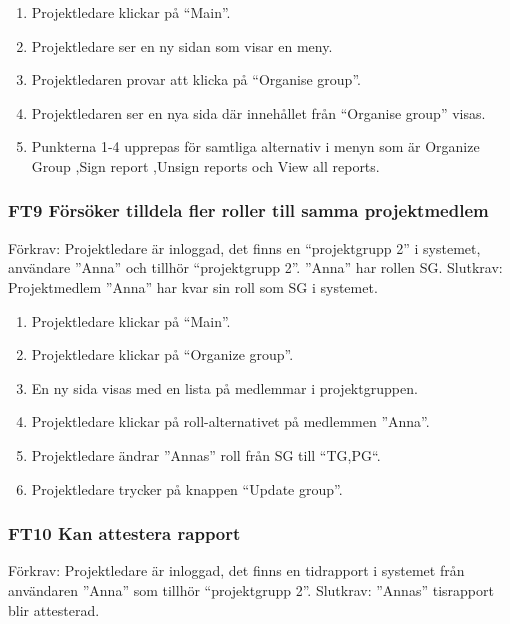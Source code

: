 \documentclass[paper=a4, fontsize=11pt,twoside]{article}
\begin{document}
	\begin{enumerate}
	  \item Projektledare klickar på “Main”.
	  \item Projektledare ser en ny sidan som visar en meny.
	  \item Projektledaren provar att klicka på “Organise group”.
      \item Projektledaren ser en nya sida där innehållet från “Organise group”
      visas. 
      \item Punkterna 1-4 upprepas för samtliga alternativ i menyn som är
      Organize Group ,Sign report ,Unsign reports och View all reports.
	\end{enumerate}
	
	\subsubsection*{FT9 Försöker tilldela fler roller till samma projektmedlem}
	
	Förkrav: Projektledare är inloggad, det finns en “projektgrupp 2” i systemet,
	användare  ”Anna” och tillhör “projektgrupp 2”. ”Anna” har rollen SG.
	\newline
	Slutkrav: Projektmedlem ”Anna” har kvar sin roll som SG i systemet.
	
	\begin{enumerate}
	 \item Projektledare klickar på “Main”.
	\item Projektledare klickar på “Organize group”.
	\item En ny sida visas med en lista på medlemmar i projektgruppen.
	\item Projektledare klickar på roll-alternativet på medlemmen ”Anna”.
	\item Projektledare ändrar ”Annas” roll från SG till “TG,PG“.
	\item Projektledare trycker på knappen “Update group”.

	  
	\end{enumerate}

	\subsubsection*{FT10 Kan attestera rapport}
		Förkrav: Projektledare är inloggad, det finns en tidrapport i systemet från
		användaren  ”Anna” som tillhör “projektgrupp 2”.
		\newline
		Slutkrav: ”Annas” tisrapport blir attesterad.
		
\end{document}
